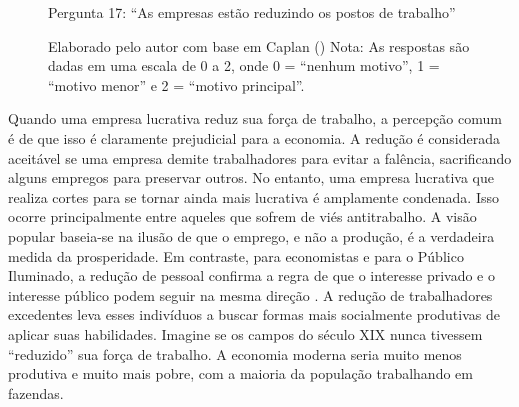 \begin{figure}[H]
    \centering
    \caption*{Pergunta 17: “As empresas estão reduzindo os postos de trabalho”}
    \caption{Elaborado pelo autor com base em Caplan (\citeyear{The_Myth_of_the_Rational_Voter}) \newline
    Nota: As respostas são dadas em uma escala de 0 a 2, onde 0 = “nenhum motivo”, 1 = “motivo menor” e 2 = “motivo principal”.}
    \label{fig:pergunta_17}
\end{figure}

Quando uma empresa lucrativa reduz sua força de trabalho, a percepção comum é de que isso é claramente prejudicial para a economia. A redução é considerada aceitável se uma empresa demite trabalhadores para evitar a falência, sacrificando alguns empregos para preservar outros. No entanto, uma empresa lucrativa que realiza cortes para se tornar ainda mais lucrativa é amplamente condenada. Isso ocorre principalmente entre aqueles que sofrem de viés antitrabalho. A visão popular baseia-se na ilusão de que o emprego, e não a produção, é a verdadeira medida da prosperidade. Em contraste, para economistas e para o Público Iluminado, a redução de pessoal confirma a regra de que o interesse privado e o interesse público podem seguir na mesma direção \cite{Myths-of-Rich-and-Poor,The_Myth_of_the_Rational_Voter}. A redução de trabalhadores excedentes leva esses indivíduos a buscar formas mais socialmente produtivas de aplicar suas habilidades. Imagine se os campos do século XIX nunca tivessem “reduzido” sua força de trabalho. A economia moderna seria muito menos produtiva e muito mais pobre, com a maioria da população trabalhando em fazendas.


